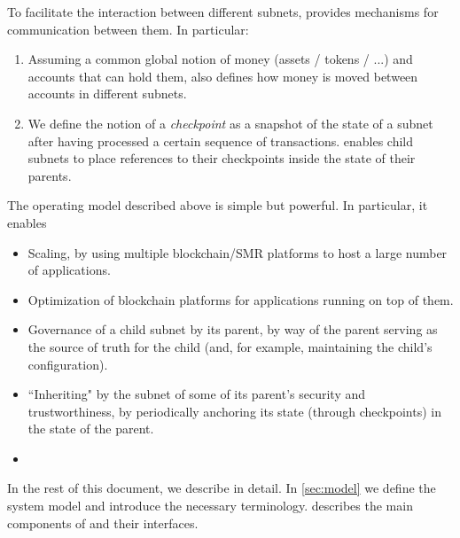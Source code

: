 To facilitate the interaction between different subnets, \nameAbbr provides mechanisms for communication between them.
In particular:
\begin{enumerate}
    \item Assuming a common global notion of money (assets / tokens / ...) and accounts that can hold them, \nameAbbr also defines how money is moved between accounts in different subnets.
    \item We define the notion of a \emph{checkpoint} as a snapshot of the state of a subnet after having processed a certain sequence of transactions.
    \nameAbbr enables child subnets to place references to their checkpoints inside the state of their parents.
\end{enumerate}

The operating model described above is simple but powerful.
In particular, it enables
\begin{itemize}
    \item Scaling, by using multiple blockchain/SMR platforms to host a large number of applications.
    \item Optimization of blockchain platforms for applications running on top of them.
    \item Governance of a child subnet by its parent, by way of the parent serving as the source of truth for the child (and, for example, maintaining the child's configuration).
    \item ``Inheriting" by the subnet of some of its parent's security and trustworthiness, by periodically anchoring its state (through checkpoints) in the state of the parent.
    \item {}
\end{itemize}

In the rest of this document, we describe \nameAbbr in detail.
In \cref{sec:model} we define the system model and introduce the necessary terminology.
 describes the main components of \nameAbbr and their interfaces.
